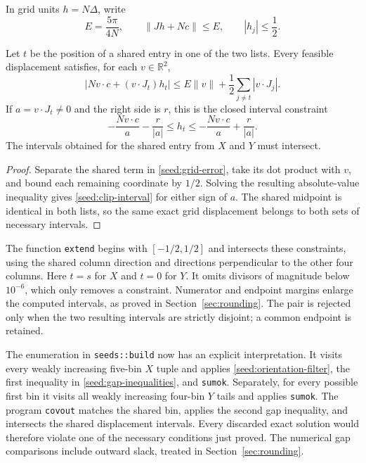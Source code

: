 In grid units $h=N\Delta$, write
\begin{equation}
\label{seed:grid-error}
 E=\frac{5\pi}{4N},\qquad \|Jh+Nc\|\le E,
 \qquad |h_j|\le\frac12.
\end{equation}

\begin{lemma}
\label{seed:shared-interval}
Let $t$ be the position of a shared entry in one of the two lists.  Every
feasible displacement satisfies, for each $v\in\mathbb R^2$,
\begin{equation}
\label{seed:clip-inequality}
 |Nv\cdot c+(v\cdot J_t)h_t|
 \le E\|v\|+\frac12\sum_{j\ne t}|v\cdot J_j|.
\end{equation}
If $a=v\cdot J_t\ne0$ and the right side is $r$, this is the closed
interval constraint
\begin{equation}
\label{seed:clip-interval}
 -\frac{Nv\cdot c}{a}-\frac r{|a|}
 \le h_t\le
 -\frac{Nv\cdot c}{a}+\frac r{|a|}.
\end{equation}
The intervals obtained for the shared entry from $X$ and $Y$ must intersect.
\end{lemma}

\begin{proof}
Separate the shared term in \eqref{seed:grid-error}, take its dot product
with $v$, and bound each remaining coordinate by $1/2$.  Solving the
resulting absolute-value inequality gives \eqref{seed:clip-interval} for
either sign of $a$.  The shared midpoint is identical in both lists, so
the same exact grid displacement belongs to both sets of necessary
intervals.
\end{proof}

The function \texttt{extend} begins with $[-1/2,1/2]$ and intersects these
constraints, using the shared column direction and directions perpendicular
to the other four columns.  Here $t=s$ for $X$ and $t=0$ for $Y$.
It omits divisors of magnitude below $10^{-6}$, which only removes a
constraint.  Numerator and endpoint margins enlarge the computed intervals,
as proved in Section~\ref{sec:rounding}.  The pair is rejected only when
the two resulting intervals are strictly disjoint; a common endpoint is
retained.

The enumeration in \texttt{seeds::build} now has an explicit interpretation.
It visits every weakly increasing five-bin $X$ tuple and applies
\eqref{seed:orientation-filter}, the first inequality in
\eqref{seed:gap-inequalities}, and \texttt{sumok}.  Separately, for every
possible first bin it visits all weakly increasing four-bin $Y$ tails and
applies \texttt{sumok}.  The program \texttt{covout} matches the shared
bin, applies the second gap inequality, and intersects the shared
displacement intervals.  Every discarded exact solution would therefore
violate one of the necessary conditions just proved.  The numerical gap
comparisons include outward slack, treated in Section~\ref{sec:rounding}.

